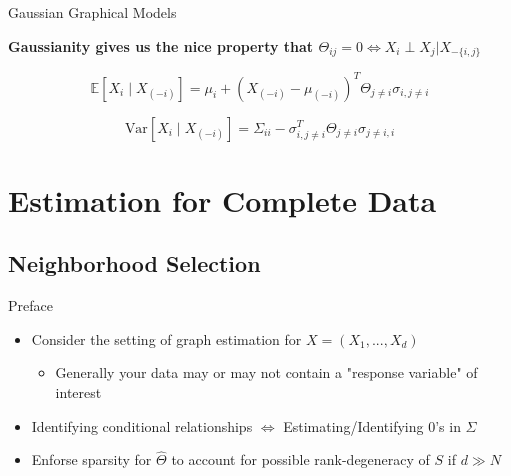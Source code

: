 \documentclass{beamer}
\begin{document}
\begin{frame}{Gaussian Graphical Models}

{\bf Gaussianity gives us the nice property that $\Theta_{ij}=0 \Leftrightarrow X_i \perp X_j | X_{-\{i,j\}}$ }

\[
\mathbb{E}[X_i \mid X_{(-i)}] = \mu_i + (X_{(-i)} - \mu_{(-i)})^T \Theta_{j \neq i} \sigma_{i, j\neq i}
\]

\[
\text{Var}[X_i \mid X_{(-i)}] = \Sigma_{ii} - \sigma_{i, j \neq i}^T \Theta_{j \neq i} \sigma_{j \neq i, i}
\]

\end{frame}



\section{Estimation for Complete Data}

\subsection{Neighborhood Selection}

\begin{frame}{Preface}
    \begin{itemize}\setlength\itemsep{6mm}
        \item Consider the setting of graph estimation for $X = (X_1, ..., X_d)$
        \begin{itemize} \item Generally your data may or may not contain a "response variable" of interest \end{itemize}
        \item Identifying conditional relationships $\Leftrightarrow$ Estimating/Identifying 0's in $\Sigma$
        \item Enforse sparsity for $\hat\Theta$ to account for possible rank-degeneracy of $S$ if $d \gg N$
    \end{itemize}
\end{frame}
\end{document}
